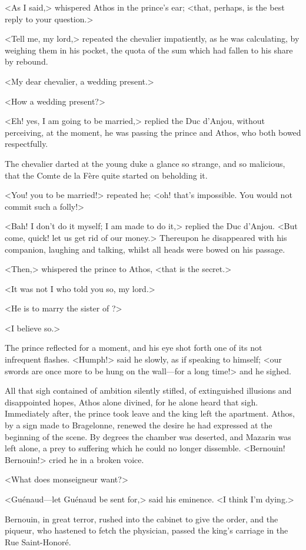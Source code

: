 <As I said,> whispered Athos in the prince's ear; <that, perhaps, is the best reply to your question.>

<Tell me, my lord,> repeated the chevalier impatiently, as he was calculating, by weighing them in his pocket, the quota of the sum which had fallen to his share by rebound.

<My dear chevalier, a wedding present.>

<How a wedding present?>

<Eh! yes, I am going to be married,> replied the Duc d'Anjou, without perceiving, at the moment, he was passing the prince and Athos, who both bowed respectfully.

The chevalier darted at the young duke a glance so strange, and so malicious, that the Comte de la Fère quite started on beholding it.

<You! you to be married!> repeated he; <oh! that's impossible. You would not commit such a folly!>

<Bah! I don't do it myself; I am made to do it,> replied the Duc d'Anjou. <But come, quick! let us get rid of our money.> Thereupon he disappeared with his companion, laughing and talking, whilst all heads were bowed on his passage.

<Then,> whispered the prince to Athos, <that is the secret.>

<It was not I who told you so, my lord.>

<He is to marry the sister of ?>

<I believe so.>

The prince reflected for a moment, and his eye shot forth one of its not infrequent flashes. <Humph!> said he slowly, as if speaking to himself; <our swords are once more to be hung on the wall—for a long time!> and he sighed.

All that sigh contained of ambition silently stifled, of extinguished illusions and disappointed hopes, Athos alone divined, for he alone heard that sigh. Immediately after, the prince took leave and the king left the apartment. Athos, by a sign made to Bragelonne, renewed the desire he had expressed at the beginning of the scene. By degrees the chamber was deserted, and Mazarin was left alone, a prey to suffering which he could no longer dissemble. <Bernouin! Bernouin!> cried he in a broken voice.

<What does monseigneur want?>

<Guénaud—let Guénaud be sent for,> said his eminence. <I think I'm dying.>

Bernouin, in great terror, rushed into the cabinet to give the order, and the piqueur, who hastened to fetch the physician, passed the king's carriage in the Rue Saint-Honoré. 